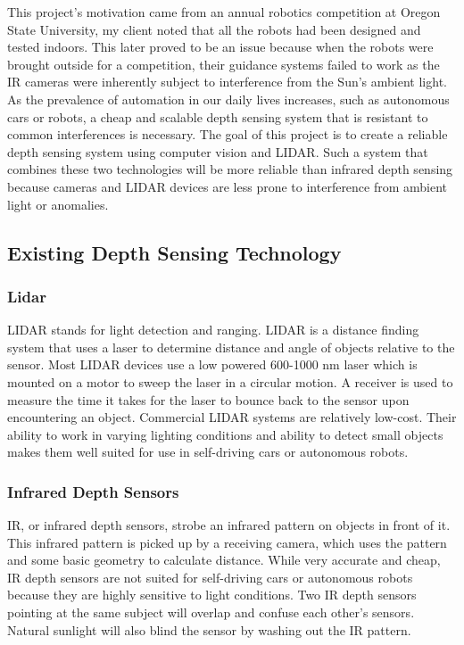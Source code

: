 \documentclass[onecolumn, draftclsnofoot,10pt, compsoc]{IEEEtran}
\begin{document}
\begin{singlespace}
		This project's motivation came from an annual robotics competition at Oregon State University, my client noted that all the robots had been designed and tested indoors.
		This later proved to be an issue because when the robots were brought outside for a competition, their guidance systems failed to work as the IR cameras were inherently subject to interference from the Sun's ambient light.
		As the prevalence of automation in our daily lives increases, such as autonomous cars or robots, a cheap and scalable depth sensing system that is resistant to common interferences is necessary.
		The goal of this project is to create a reliable depth sensing system using computer vision and LIDAR.
		Such a system that combines these two technologies will be more reliable than infrared depth sensing because cameras and LIDAR devices are less prone to interference from ambient light or anomalies.

	\subsection{Existing Depth Sensing Technology}
		\subsubsection{Lidar}
			LIDAR stands for light detection and ranging.
			LIDAR is a distance finding system that uses a laser to determine distance and angle of objects relative to the sensor.
			Most LIDAR devices use a low powered 600-1000 nm laser which is mounted on a motor to sweep the laser in a circular motion.
			A receiver is used to measure the time it takes for the laser to bounce back to the sensor upon encountering an object.
			Commercial LIDAR systems are relatively low-cost.
			Their ability to work in varying lighting conditions and ability to detect small objects makes them well suited for use in self-driving cars or autonomous robots. \cite{lidar-uk}

		\subsubsection{Infrared Depth Sensors}
			IR, or infrared depth sensors, strobe an infrared pattern on objects in front of it.
			This infrared pattern is picked up by a receiving camera, which uses the pattern and some basic geometry to calculate distance.
			While very accurate and cheap, IR depth sensors are not suited for self-driving cars or autonomous robots because they are highly sensitive to light conditions.
			Two IR depth sensors pointing at the same subject will overlap and confuse each other's sensors.
			Natural sunlight will also blind the sensor by washing out the IR pattern. \cite{ibrahim_2018}


\end{singlespace}
\end{document}
